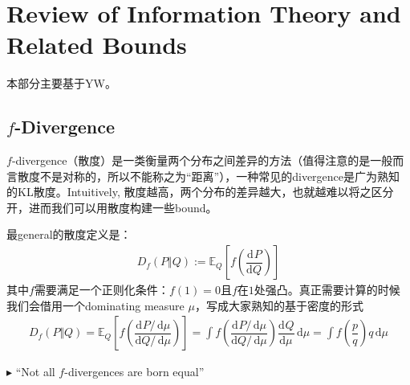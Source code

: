 \documentclass[11pt,a4paper]{ctexart}
\numberwithin{equation}{section}%
\newenvironment{point}{\raggedright$\blacktriangleright$}{}
\begin{document}
\section{Review of Information Theory and Related Bounds}

本部分主要基于YW。



\subsection{$ f $-Divergence}


$ f $-divergence（散度）是一类衡量两个分布之间差异的方法（值得注意的是一般而言散度不是对称的，所以不能称之为“距离”），一种常见的divergence是广为熟知的KL散度。Intuitively, 散度越高，两个分布的差异越大，也就越难以将之区分开，进而我们可以用散度构建一些bound。

最general的散度定义是：
\begin{align*}
    D_f(P\Vert Q):= \mathbb{E}_Q\left[ f(\dfrac{\mathrm{d}^{} P }{\mathrm{d} Q^{} }) \right] 
\end{align*}
其中$ f $需要满足一个正则化条件：$ f(1)=0 $且$ f $在$ 1 $处强凸。真正需要计算的时候我们会借用一个dominating measure $ \mu $，写成大家熟知的基于密度的形式
\begin{align*}
    D_f(P\Vert Q)= \mathbb{E}_Q\left[ f(\dfrac{\mathrm{d}^{} P/\,\mathrm{d}\mu  }{\mathrm{d} Q/\,\mathrm{d}\mu  }) \right] = \int f(\dfrac{\mathrm{d}^{} P/\,\mathrm{d}\mu  }{\mathrm{d} Q/\,\mathrm{d}\mu  })  \dfrac{\mathrm{d}^{} Q }{\mathrm{d} \mu ^{} }\,\mathrm{d}\mu = \int f(\dfrac{ p  }{ q } ) q\,\mathrm{d}\mu 
\end{align*}



\begin{point}
    “Not all $ f $-divergences are born equal”
\end{point}
\end{document}
